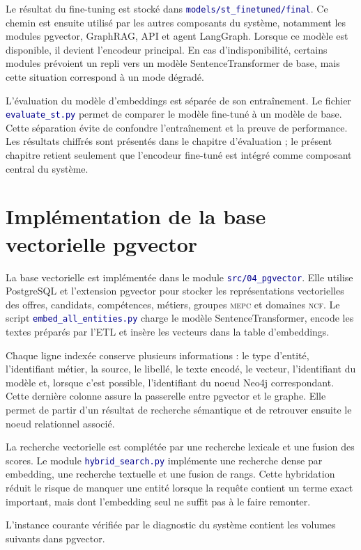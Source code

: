 \documentclass[12pt,twoside]{report}
\newcommand{\filevar}[1]{\texttt{\textcolor{darkblue}{#1}}}
\newcommand{\MEPC}{\textsc{mepc}}
\newcommand{\NCF}{\textsc{ncf}}
\begin{document}
Le résultat du fine-tuning est stocké dans \filevar{models/st\_finetuned/final}. Ce chemin est ensuite utilisé par les autres composants du système, notamment les modules pgvector, GraphRAG, API et agent LangGraph. Lorsque ce modèle est disponible, il devient l'encodeur principal. En cas d'indisponibilité, certains modules prévoient un repli vers un modèle SentenceTransformer de base, mais cette situation correspond à un mode dégradé.

L'évaluation du modèle d'embeddings est séparée de son entraînement. Le fichier \filevar{evaluate\_st.py} permet de comparer le modèle fine-tuné à un modèle de base. Cette séparation évite de confondre l'entraînement et la preuve de performance. Les résultats chiffrés sont présentés dans le chapitre d'évaluation ; le présent chapitre retient seulement que l'encodeur fine-tuné est intégré comme composant central du système.

\section{Implémentation de la base vectorielle pgvector}

La base vectorielle est implémentée dans le module \filevar{src/04\_pgvector}. Elle utilise PostgreSQL et l'extension pgvector pour stocker les représentations vectorielles des offres, candidats, compétences, métiers, groupes \MEPC{} et domaines \NCF{}. Le script \filevar{embed\_all\_entities.py} charge le modèle SentenceTransformer, encode les textes préparés par l'ETL et insère les vecteurs dans la table d'embeddings.

Chaque ligne indexée conserve plusieurs informations : le type d'entité, l'identifiant métier, la source, le libellé, le texte encodé, le vecteur, l'identifiant du modèle et, lorsque c'est possible, l'identifiant du noeud Neo4j correspondant. Cette dernière colonne assure la passerelle entre pgvector et le graphe. Elle permet de partir d'un résultat de recherche sémantique et de retrouver ensuite le noeud relationnel associé.

La recherche vectorielle est complétée par une recherche lexicale et une fusion des scores. Le module \filevar{hybrid\_search.py} implémente une recherche dense par embedding, une recherche textuelle et une fusion de rangs. Cette hybridation réduit le risque de manquer une entité lorsque la requête contient un terme exact important, mais dont l'embedding seul ne suffit pas à le faire remonter.

L'instance courante vérifiée par le diagnostic du système contient les volumes suivants dans pgvector.
\end{document}
